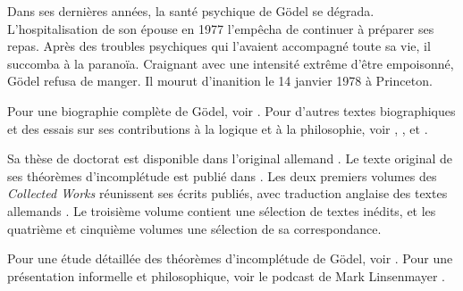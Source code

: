 \documentclass[../../../include/open-logic-section]{subfiles}
\begin{document}
Dans ses
dernières années,
la santé
psychique de
G{\"o}del
se dégrada.
L'hospitalisation
de son épouse
en 1977
l'empêcha
de continuer
à préparer
ses repas.
Après des
troubles psychiques
qui l'avaient
accompagné
toute sa vie,
il succomba
à la paranoïa.
Craignant
avec une
intensité
extrême d'être
empoisonné,
G{\"o}del refusa
de manger.
Il mourut
d'inanition
le 14 janvier 1978
à Princeton.

\begin{reading}
Pour une biographie
complète de
G{\"o}del, voir
\citet{Dawson1997}.
Pour d'autres
textes biographiques
et des essais
sur ses contributions
à la logique
et à la philosophie,
voir
\citet{Wang1990},
\citet{Baaz2011},
\citet{Takeuti2003}
et
\citet{Sigmund2007}.

Sa thèse de
doctorat est
disponible
dans l'original
allemand
\citep{Godel1929}.
Le texte
original de
ses théorèmes
d'incomplétude
est publié
dans
\citep{Godel1931}.
Les deux premiers volumes des \emph{Collected Works}
réunissent ses écrits publiés, avec traduction anglaise des textes
allemands \citep{Godel1986,Godel1990}. Le troisième volume
contient une sélection de textes inédits, et les quatrième et
cinquième volumes une sélection de sa correspondance.

Pour une étude
détaillée des
théorèmes
d'incomplétude
de G{\"o}del,
voir
\citet{Smith2013}.
Pour une
présentation
informelle et
philosophique,
voir le podcast
de Mark
Linsenmayer
\citep{Linsenmayer2014}.
\end{reading}
\end{document}

